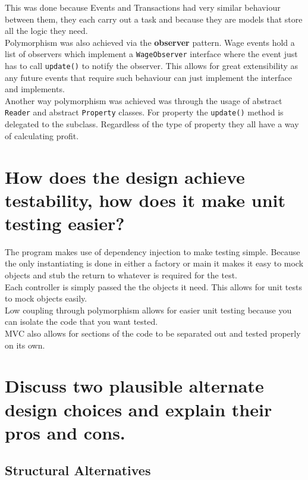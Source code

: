 \documentclass{article}
\begin{document}
This was done because Events and Transactions had very similar behaviour between them, they each carry out a task and because they are models that store all the logic they need.\\

Polymorphism was also achieved via the \textbf{observer} pattern. Wage events hold a list of observers which implement a \texttt{WageObserver} interface where the event just has to call \texttt{update()} to notify the observer. This allows for great extensibility as any future events that require such behaviour can just implement the interface and implements.\\ 

Another way polymorphism was achieved was through the usage of abstract \texttt{Reader} and abstract \texttt{Property} classes. For property the \texttt{update()} method is delegated to the subclass. Regardless of the type of property they all have a way of calculating profit.\\

\pagebreak
\section*{How does the design achieve testability, how does it make unit testing easier?}

The program makes use of dependency injection to make testing simple. Because the only instantiating is done in either a factory or main it makes it easy to mock objects and stub the return to whatever is required for the test.\\

Each controller is simply passed the the objects it need. This allows for unit tests to mock objects easily.\\

Low coupling through polymorphism allows for easier unit testing because you can isolate the code that you want tested.\\

MVC also allows for sections of the code to be separated out and tested properly on its own.\\

\section*{Discuss two plausible alternate design choices and explain their pros and cons.}

\subsection*{Structural Alternatives}
\end{document}
